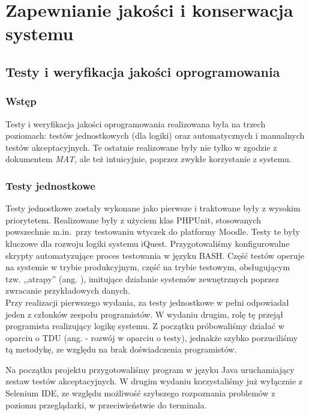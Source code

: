 \chapter{Zapewnianie jakości i konserwacja systemu}
\label{Chapter7}

\section{Testy i weryfikacja jakości oprogramowania}
\label{Chapter71}

\subsection{Wstęp}
\label{Chapter711}

Testy i weryfikacja jakości oprogramowania realizowana była na trzech poziomach: testów jednostkowych (dla logiki) oraz automatycznych i manualnych testów akceptacyjnych. Te ostatnie realizowane były nie tylko w zgodzie z dokumentem \textit{MAT}\cite{Redmine:ProjDocs}, ale też intuicyjnie, poprzez zwykłe korzystanie z systemu.

\subsection{Testy jednostkowe}
\label{Chapter712}

Testy jednostkowe zostały wykonane jako pierwsze i traktowane były z wysokim priorytetem. Realizowane były z użyciem klas PHPUnit, stosowanych powszechnie m.in.~przy testowaniu wtyczek do platformy Moodle. Testy te były kluczowe dla rozwoju logiki systemu iQuest. Przygotowaliśmy konfigurowalne skrypty automatyzujące proces testowania w języku BASH. Część testów operuje na systemie w trybie produkcyjnym, część na trybie testowym, obsługującym tzw. ,,atrapy'' (ang. ), imitujące działanie systemów zewnętrznych poprzez zwracanie przykładowych danych.\\

Przy realizacji pierwszego wydania, za testy jednostkowe w pełni odpowiadał jeden z członków zespołu programistów. W wydaniu drugim, rolę tę przejął programista realizujący logikę systemu. Z początku próbowaliśmy działać w oparciu o TDU (ang.  - rozwój w oparciu o testy), jednakże szybko porzuciliśmy tą metodykę, ze względu na brak doświadczenia programistów.

Na początku projektu przygotowaliśmy program w języku Java uruchamiający zestaw testów akceptacyjnych. W drugim wydaniu korzystaliśmy już wyłącznie z Selenium IDE, ze względu możliwość szybszego rozpoznania problemów z poziomu przeglądarki, w przeciwieństwie do terminala.

